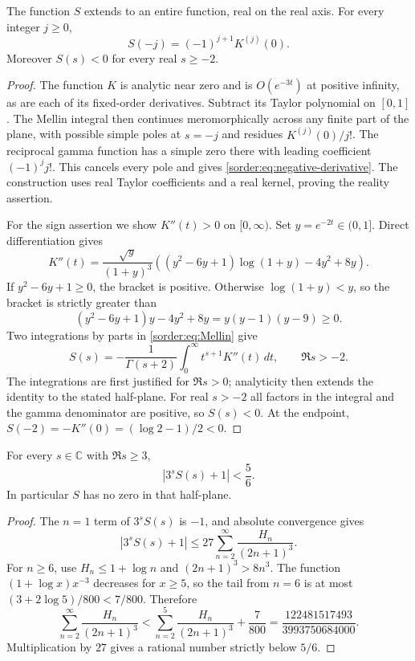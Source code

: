 \begin{proposition}\label{sorder:prop:entire}
The function $S$ extends to an entire function, real on the real axis.
For every integer $j\ge0$,
\begin{equation}\label{sorder:eq:negative-derivative}
 S(-j)=(-1)^{j+1}K^{(j)}(0).
\end{equation}
Moreover $S(s)<0$ for every real $s\ge-2$.
\end{proposition}
\begin{proof}
The function $K$ is analytic near zero and is $O(e^{-3t})$ at positive
infinity, as are each of its fixed-order derivatives. Subtract its
Taylor polynomial on $[0,1]$. The Mellin integral then continues
meromorphically across any finite part of the plane, with possible
simple poles at $s=-j$ and residues $K^{(j)}(0)/j!$.
The reciprocal gamma function has a simple zero there with leading
coefficient $(-1)^j j!$. This cancels every pole and gives
\eqref{sorder:eq:negative-derivative}. The construction uses real
Taylor coefficients and a real kernel, proving the reality assertion.

For the sign assertion we show $K''(t)>0$ on $[0,\infty)$. Set
$y=e^{-2t}\in(0,1]$. Direct differentiation gives
\begin{equation}\label{sorder:eq:Ksecond}
 K''(t)=\frac{\sqrt y}{(1+y)^3}
 \left((y^2-6y+1)\log(1+y)-4y^2+8y\right).
\end{equation}
If $y^2-6y+1\ge0$, the bracket is positive. Otherwise
$\log(1+y)<y$, so the bracket is strictly greater than
\[
 (y^2-6y+1)y-4y^2+8y=y(y-1)(y-9)\ge0.
\]
Two integrations by parts in \eqref{sorder:eq:Mellin} give
\begin{equation}\label{sorder:eq:twice-parts}
 S(s)=-\frac1{\Gamma(s+2)}
       \int_0^\infty t^{s+1}K''(t)\,dt,
       \qquad \Re s>-2.
\end{equation}
The integrations are first justified for $\Re s>0$; analyticity then
extends the identity to the stated half-plane. For real $s>-2$ all
factors in the integral and the gamma denominator are positive, so
$S(s)<0$. At the endpoint,
$S(-2)=-K''(0)=(\log2-1)/2<0$.
\end{proof}

\begin{corollary}\label{sorder:cor:right-half-plane}
For every $s\in\mathbb C$ with $\Re s\ge3$,
\[
 |3^sS(s)+1|<\frac56.
\]
In particular $S$ has no zero in that half-plane.
\end{corollary}
\begin{proof}
The $n=1$ term of $3^sS(s)$ is $-1$, and absolute convergence gives
\[
 |3^sS(s)+1|\le27\sum_{n=2}^\infty\frac{H_n}{(2n+1)^3}.
\]
For $n\ge6$, use $H_n\le1+\log n$ and
$(2n+1)^3>8n^3$. The function $(1+\log x)x^{-3}$ decreases for
$x\ge5$, so the tail from $n=6$ is at most
$(3+2\log5)/800<7/800$. Therefore
\[
 \sum_{n=2}^\infty\frac{H_n}{(2n+1)^3}
 <\sum_{n=2}^5\frac{H_n}{(2n+1)^3}+\frac7{800}
 =\frac{122481517493}{3993750684000}.
\]
Multiplication by $27$ gives a rational number strictly below $5/6$.
\end{proof}


